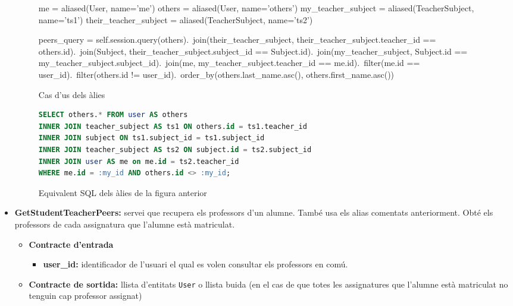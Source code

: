 \begin{itemize}
			\begin{figure}[h!]
				\begin{python}
me = aliased(User, name='me')
others = aliased(User, name='others')
my_teacher_subject = aliased(TeacherSubject, name='ts1')
their_teacher_subject = aliased(TeacherSubject, name='ts2')

peers_query = self.session.query(others).\
	join(their_teacher_subject, their_teacher_subject.teacher_id == others.id).\
	join(Subject, their_teacher_subject.subject_id == Subject.id).\
	join(my_teacher_subject, Subject.id == my_teacher_subject.subject_id).\
	join(me, my_teacher_subject.teacher_id == me.id).\
	filter(me.id == user_id).\
	filter(others.id != user_id).\
	order_by(others.last_name.asc(), others.first_name.asc())
	 			\end{python}
	 			\label{fig:alias_sqlalchemy}
	 			\caption{Cas d'us dels àlies}
	 		\end{figure}
	 		
	 		\begin{figure}[h]
	 			\begin{lstlisting}[language=SQL, frame=none]
SELECT others.* FROM user AS others
INNER JOIN teacher_subject AS ts1 ON others.id = ts1.teacher_id
INNER JOIN subject ON ts1.subject_id = ts1.subject_id
INNER JOIN teacher_subject AS ts2 ON subject.id = ts2.subject_id
INNER JOIN user AS me on me.id = ts2.teacher_id
WHERE me.id = :my_id AND others.id <> :my_id;
				\end{lstlisting}
				\label{fig:alias_sqlalchemy_sql}
				\caption{Equivalent \ac{SQL} dels àlies de la figura anterior}
			\end{figure}
			
			\item \textbf{GetStudentTeacherPeers:} servei que recupera els professors d'un alumne. També usa els alias comentats anteriorment. Obté els professors de cada assignatura que l'alumne està matriculat.
			
			\begin{itemize}
					\item \textbf{Contracte d'entrada}
						\begin{itemize}
							\item \textbf{user\_id:} identificador de l'usuari el qual es volen consultar els professors en comú.
						\end{itemize}
					\item \textbf{Contracte de sortida:} llista d'entitats \texttt{User} o llista buida (en el cas de que totes les assignatures que l'alumne està matriculat no tenguin cap professor assignat)
				\end{itemize}
				

\end{itemize}
